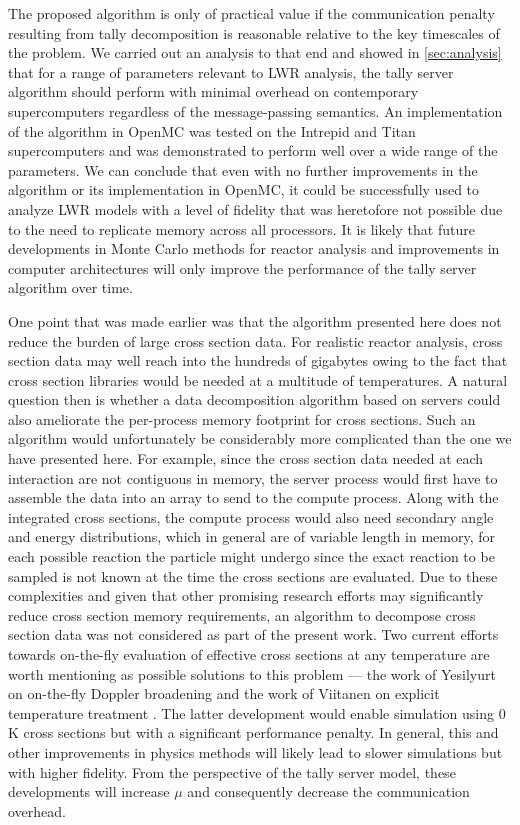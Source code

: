 \documentclass[3p,fleqn]{elsarticle}
\begin{document}
The proposed algorithm is only of practical value if the communication penalty
resulting from tally decomposition is reasonable relative to the key timescales
of the problem. We carried out an analysis to that end and showed in
\autoref{sec:analysis} that for a range of parameters relevant to LWR analysis,
the tally server algorithm should perform with minimal overhead on contemporary
supercomputers regardless of the message-passing semantics. An implementation of
the algorithm in OpenMC was tested on the Intrepid and Titan supercomputers and
was demonstrated to perform well over a wide range of the parameters. We can
conclude that even with no further improvements in the algorithm or its
implementation in OpenMC, it could be successfully used to analyze LWR models
with a level of fidelity that was heretofore not possible due to the need to
replicate memory across all processors. It is likely that future developments in
Monte Carlo methods for reactor analysis and improvements in computer
architectures will only improve the performance of the tally server algorithm
over time.

One point that was made earlier was that the algorithm presented here does not
reduce the burden of large cross section data. For realistic reactor analysis,
cross section data may well reach into the hundreds of gigabytes owing to the
fact that cross section libraries would be needed at a multitude of
temperatures. A natural question then is whether a data decomposition algorithm
based on servers could also ameliorate the per-process memory footprint for
cross sections. Such an algorithm would unfortunately be considerably more
complicated than the one we have presented here. For example, since the cross
section data needed at each interaction are not contiguous in memory, the server
process would first have to assemble the data into an array to send to the
compute process. Along with the integrated cross sections, the compute process
would also need secondary angle and energy distributions, which in general are
of variable length in memory, for each possible reaction the particle might
undergo since the exact reaction to be sampled is not known at the time the
cross sections are evaluated. Due to these complexities and given that other
promising research efforts may significantly reduce cross section memory
requirements, an algorithm to decompose cross section data was not considered as
part of the present work. Two current efforts towards on-the-fly evaluation of
effective cross sections at any temperature are worth mentioning as possible
solutions to this problem --- the work of Yesilyurt on on-the-fly Doppler
broadening \cite{nse-yesilyurt-2012} and the work of Viitanen on explicit
temperature treatment \cite{nse-viitanen-2012}. The latter development would
enable simulation using 0 K cross sections but with a significant performance
penalty. In general, this and other improvements in physics methods will likely
lead to slower simulations but with higher fidelity. From the perspective of the
tally server model, these developments will increase $\mu$ and consequently
decrease the communication overhead.
\end{document}
